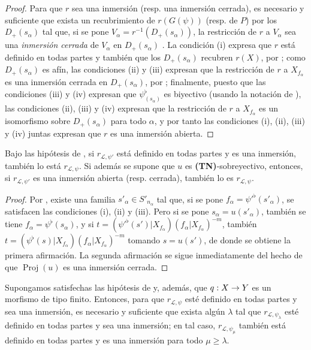 \documentclass[oneside,10pt]{amsart}
\makeatletter
\renewcommand{\geq}{\geqslant}
\newcommand{\ega@arrow}[2]{\mathchoice{#1}{#2}{#2}{#2}}
\renewcommand{\to}{\ega@arrow{\longrightarrow}{\rightarrow}}
\let\EGAOriginalLabel\label
\renewcommand{\label}[1]{\phantomsection\EGAOriginalLabel{#1}}
\makeatother
\begin{document}
\begin{proof}
Para que $r$ sea una inmersión (resp. una inmersión cerrada), es necesario y suficiente que exista un recubrimiento de $r(G(\psi))$ (resp. de $P$) por los $D_+(s_\alpha)$ tal que, si se pone $V_\alpha=r^{-1}(D_+(s_\alpha))$, la restricción de $r$ a $V_\alpha$ sea una \emph{inmersión cerrada} de $V_\alpha$ en $D_+(s_\alpha)$ .
La condición (i) expresa que $r$ está definido en todas partes y también que los $D_+(s_\alpha)$ recubren $r(X)$, por ;
como $D_+(s_\alpha)$ es afín, las condiciones (ii) y (iii) expresan que la restricción de $r$ a $X_{f_\alpha}$ es una inmersión cerrada en $D_+(s_\alpha)$, por ;
finalmente, puesto que las condiciones (iii) y (iv) expresan que $\psi_{(s_\alpha)}^\flat$ es biyectivo (usando la notación de ), las condiciones (ii), (iii) y (iv) expresan que la restricción de $r$ a $X_{f_\alpha}$ es un isomorfismo sobre $D_+(s_\alpha)$ para todo $\alpha$, y por tanto las condiciones (i), (ii), (iii) y (iv) juntas expresan que $r$ es una inmersión abierta.
\end{proof}

\begin{corollary}[3.8.3]
\label{II.3.8.3-fr}
Bajo las hipótesis de , si $r_{\mathcal{L},\psi'}$ está definido en todas partes y es una inmersión, también lo está $r_{\mathcal{L},\psi}$.
Si además se supone que $u$ es \textup{\textbf{(TN)}}-sobreyectivo, entonces, si $r_{\mathcal{L},\psi'}$ es una inmersión abierta \textup{(resp.} cerrada\textup{)}, también lo es $r_{\mathcal{L},\psi}$.
\end{corollary}

\begin{proof}
Por , existe una familia $s'_\alpha\in S'_{n_\alpha}$ tal que, si se pone $f_\alpha=\psi'^\flat(s'_\alpha)$, se satisfacen las condiciones (i), (ii) y (iii).
Pero si se pone $s_\alpha=u(s'_\alpha)$, también se tiene $f_\alpha=\psi^\flat(s_\alpha)$, y si $t=(\psi'^\flat(s')|X_{f_\alpha})(f_\alpha|X_{f_\alpha})^{-m}$, también $t=(\psi^\flat(s)|X_{f_\alpha})(f_\alpha|X_{f_\alpha})^{-m}$ tomando $s=u(s')$, de donde se obtiene la primera afirmación.
La segunda afirmación se sigue inmediatamente del hecho de que $\operatorname{Proj}(u)$ es una inmersión cerrada.
\end{proof}

\begin{proposition}[3.8.4]
\label{II.3.8.4-fr}
Supongamos satisfechas las hipótesis de  y, además, que $q:X\to Y$ es un morfismo de tipo finito.
Entonces, para que $r_{\mathcal{L},\psi}$ esté definido en todas partes y sea una inmersión, es necesario y suficiente que exista algún $\lambda$ tal que $r_{\mathcal{L},\psi_\lambda}$ esté definido en todas partes y sea una inmersión;
en tal caso, $r_{\mathcal{L},\psi_\mu}$ también está definido en todas partes y es una inmersión para todo $\mu\geq\lambda$.
\end{proposition}
\end{document}
